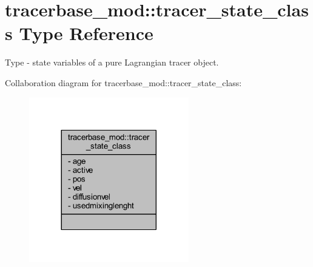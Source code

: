 \hypertarget{structtracerbase__mod_1_1tracer__state__class}{}\section{tracerbase\+\_\+mod\+:\+:tracer\+\_\+state\+\_\+class Type Reference}
\label{structtracerbase__mod_1_1tracer__state__class}


Type -\/ state variables of a pure Lagrangian tracer object.  




Collaboration diagram for tracerbase\+\_\+mod\+:\+:tracer\+\_\+state\+\_\+class\+:\nopagebreak
\begin{figure}[H]
\begin{center}
\leavevmode
\includegraphics[width=197pt]{structtracerbase__mod_1_1tracer__state__class__coll__graph}
\end{center}
\end{figure}
